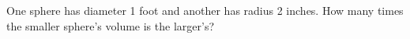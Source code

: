 One sphere has diameter 1 foot and another has radius 2 inches. How many times the smaller sphere's volume is the larger's?
